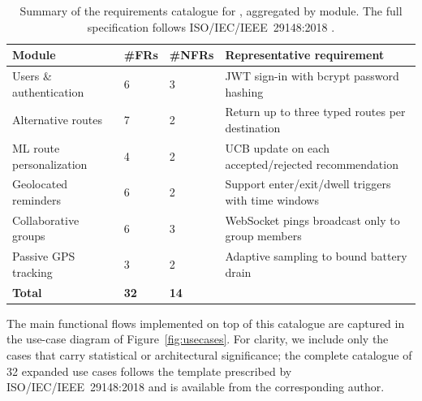\documentclass[a4paper,fleqn]{cas-sc}
\begin{document}
	\begin{table}[t]
		\caption{Summary of the requirements catalogue for \RUTAI{}, aggregated by module. The full specification follows ISO/IEC/IEEE~29148:2018 \citep{iso29148}.}
		\label{tab:requirements}
		\centering
		\begin{tabular*}{\tblwidth}{@{}LLLL@{}}
			\toprule
			Module                       & \#FRs & \#NFRs & Representative requirement \\
			\midrule
			Users \& authentication      & 6 & 3 & JWT sign-in with bcrypt password hashing \\
			Alternative routes           & 7 & 2 & Return up to three typed routes per destination \\
			ML route personalization     & 4 & 2 & UCB update on each accepted/rejected recommendation \\
			Geolocated reminders         & 6 & 2 & Support enter/exit/dwell triggers with time windows \\
			Collaborative groups         & 6 & 3 & WebSocket pings broadcast only to group members \\
			Passive GPS tracking         & 3 & 2 & Adaptive sampling to bound battery drain \\
			\midrule
			\textbf{Total}               & \textbf{32} & \textbf{14} &  \\
			\bottomrule
		\end{tabular*}
	\end{table}
	
	The main functional flows implemented on top of this catalogue are captured in the use-case diagram of Figure~\ref{fig:usecases}. For clarity, we include only the cases that carry statistical or architectural significance; the complete catalogue of 32 expanded use cases follows the template prescribed by ISO/IEC/IEEE~29148:2018 \citep{iso29148} and is available from the corresponding author.
	
\end{document}
